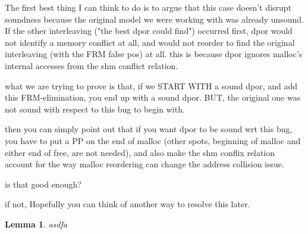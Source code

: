 \documentclass[pldi]{sigplanconf-pldi15}
\newtheorem{lemma}{Lemma}
\begin{document}
The first best thing I can think to do is to argue that this case doesn't disrupt soundness because the original model we were working with was already unsound. If the other interleaving ("the best dpor could find") occurred first, dpor would not identify a memory conflict at all, and would not reorder to find the original interleaving (with the FRM false pos) at all. this is because dpor ignores malloc's internal accesses from the shm conflict relation.

what we are trying to prove is that, if we START WITH a sound dpor, and add this FRM-elimination, you end up with a sound dpor. BUT, the original one was not sound with respect to this bug to begin with.

then you can simply point out that if you want dpor to be sound wrt this bug, you have to put a PP on the end of malloc (other spots, beginning of malloc and either end of free, are not needed), and also make the shm conflix relation account for the way malloc reordering can change the address collision issue.

is that good enough?

if not,
Hopefully you can think of another way to resolve this later.


\begin{lemma}
	asdfa
	\label{lem:leia} %
\end{lemma}

%
%
%
%
%
%
%
%
%


{}
\end{document}

